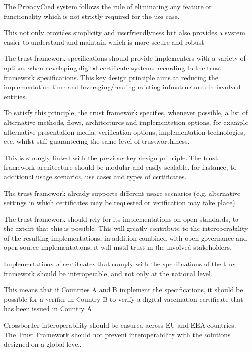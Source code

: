 \documentclass[a4paper,12pt,english]{sphinxhowto}
\begin{document}
\begin{description}
\sphinxAtStartPar
The PrivacyCred system follows the rule of  eliminating any feature or functionality which is not strictly required for the use case.

\sphinxAtStartPar
This not only provides simplicity and user\sphinxhyphen{}friendlyness but also provides a system easier to understand and maintain which is more secure and robust.

\item[{Implementation flexibility}] \leavevmode
\sphinxAtStartPar
The trust framework specifications should provide implementers with a variety of options when developing digital certificate systems according to the trust framework specifications. This key design principle aims at reducing the implementation time and leveraging/reusing existing infrastructures in involved entities.

\sphinxAtStartPar
To satisfy this principle, the trust framework specifies, whenever possible, a list of alternative methods, flows, architectures and implementation options, for example alternative presentation media, verification options, implementation technologies, etc. whilst still guaranteeing the same level of trustworthiness.

\item[{Modularity and scalability}] \leavevmode
\sphinxAtStartPar
This is strongly linked with the previous key design principle. The trust framework architecture should be modular and easily scalable, for instance, to additional usage scenarios, use cases and types of certificates.

\sphinxAtStartPar
The trust framework already supports different usage scenarios (e.g. alternative settings in which certificates may be requested or verification may take place).

\item[{Open standards}] \leavevmode
\sphinxAtStartPar
The trust framework should rely for its implementations on open standards, to the extent that this is possible. This will greatly contribute to the interoperability of the resulting implementations, in addition combined with open governance and open source implementations, it will instil trust in the involved stakeholders.

\item[{Cross\sphinxhyphen{}border interoperability}] \leavevmode
\sphinxAtStartPar
Implementations of certificates that comply with the specifications of the trust framework should be interoperable, and not only at the national level.

\sphinxAtStartPar
This means that if Countries A and B implement the specifications, it should be possible for a verifier in Country B to verify a digital vaccination certificate that has been issued in Country A.

\sphinxAtStartPar
Cross\sphinxhyphen{}border interoperability should be ensured across EU and EEA countries. The Trust Framework should not prevent interoperability with the solutions designed on a global level.

\end{description}
\end{document}
